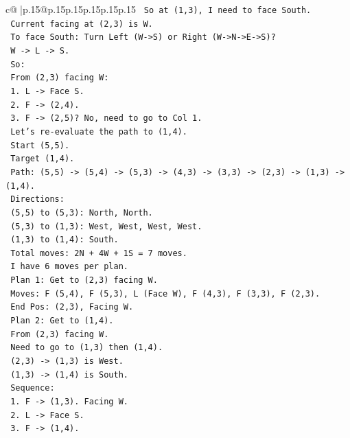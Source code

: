 \documentclass{article}
\begin{document}
{\begin{supertabular}{c@{$\;$}|p{.15\linewidth}@{}p{.15\linewidth}p{.15\linewidth}p{.15\linewidth}p{.15\linewidth}p{.15\linewidth}}
{{{\texttt{     So at (1,3), I need to face South.} \\
\texttt{     Current facing at (2,3) is W.} \\
\texttt{     To face South: Turn Left (W{-}>S) or Right (W{-}>N{-}>E{-}>S)?} \\
\texttt{     W {-}> L {-}> S.} \\
\texttt{     So:} \\
\texttt{     From (2,3) facing W:} \\
\texttt{     1. L {-}> Face S.} \\
\texttt{     2. F {-}> (2,4).} \\
\texttt{     3. F {-}> (2,5)? No, need to go to Col 1.} \\
\texttt{     Let's re{-}evaluate the path to (1,4).} \\
\texttt{     Start (5,5).} \\
\texttt{     Target (1,4).} \\
\texttt{     Path: (5,5) {-}> (5,4) {-}> (5,3) {-}> (4,3) {-}> (3,3) {-}> (2,3) {-}> (1,3) {-}> (1,4).} \\
\texttt{     Directions:} \\
\texttt{     (5,5) to (5,3): North, North.} \\
\texttt{     (5,3) to (1,3): West, West, West, West.} \\
\texttt{     (1,3) to (1,4): South.} \\
\texttt{     Total moves: 2N + 4W + 1S = 7 moves.} \\
\texttt{     I have 6 moves per plan.} \\
\texttt{     Plan 1: Get to (2,3) facing W.} \\
\texttt{     Moves: F (5,4), F (5,3), L (Face W), F (4,3), F (3,3), F (2,3).} \\
\texttt{     End Pos: (2,3), Facing W.} \\
\texttt{     Plan 2: Get to (1,4).} \\
\texttt{     From (2,3) facing W.} \\
\texttt{     Need to go to (1,3) then (1,4).} \\
\texttt{     (2,3) {-}> (1,3) is West.} \\
\texttt{     (1,3) {-}> (1,4) is South.} \\
\texttt{     Sequence:} \\
\texttt{     1. F {-}> (1,3). Facing W.} \\
\texttt{     2. L {-}> Face S.} \\
\texttt{     3. F {-}> (1,4).} \\
}}}
\end{supertabular}}
\end{document}
